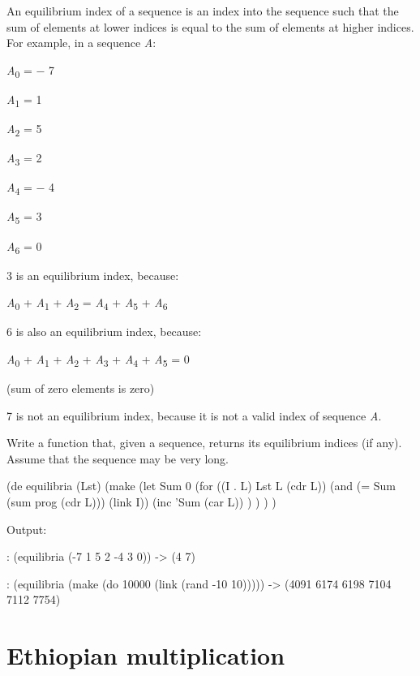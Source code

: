 An equilibrium index of a sequence is an index into the sequence such
that the sum of elements at lower indices is equal to the sum of
elements at higher indices. For example, in a sequence \emph{A}:

\emph{A}\textsubscript{0} = − 7

\emph{A}\textsubscript{1} = 1

\emph{A}\textsubscript{2} = 5

\emph{A}\textsubscript{3} = 2

\emph{A}\textsubscript{4} = − 4

\emph{A}\textsubscript{5} = 3

\emph{A}\textsubscript{6} = 0

3 is an equilibrium index, because:

\emph{A}\textsubscript{0} + \emph{A}\textsubscript{1} +
\emph{A}\textsubscript{2} = \emph{A}\textsubscript{4} +
\emph{A}\textsubscript{5} + \emph{A}\textsubscript{6}

6 is also an equilibrium index, because:

\emph{A}\textsubscript{0} + \emph{A}\textsubscript{1} +
\emph{A}\textsubscript{2} + \emph{A}\textsubscript{3} +
\emph{A}\textsubscript{4} + \emph{A}\textsubscript{5} = 0

(sum of zero elements is zero)

7 is not an equilibrium index, because it is not a valid index of
sequence \emph{A}.

Write a function that, given a sequence, returns its equilibrium indices
(if any). Assume that the sequence may be very long.


\begin{wideverbatim}

(de equilibria (Lst)
   (make
      (let Sum 0
         (for ((I . L) Lst L (cdr L))
            (and (= Sum (sum prog (cdr L))) (link I))
            (inc 'Sum (car L)) ) ) ) )

Output:

: (equilibria (-7 1 5 2 -4 3 0))
-> (4 7)

: (equilibria (make (do 10000 (link (rand -10 10)))))
-> (4091 6174 6198 7104 7112 7754)

\end{wideverbatim}

\pagebreak{}
\section*{Ethiopian multiplication}


